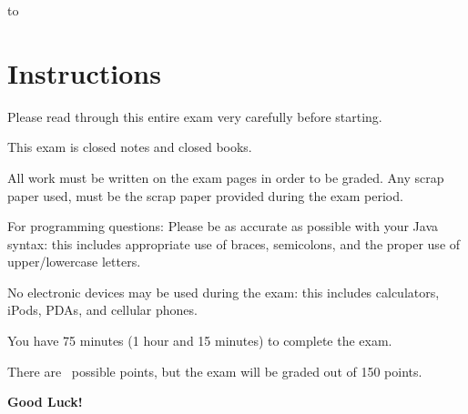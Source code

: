\documentclass[11pt]{exam}
\begin{document}
\vspace{3.0in}
\begin{center} 
\end{center} 

\lstset{language=Python,numbers=left}

\vspace{0.1in} 
\hbox to \textwidth{Name:\enspace\hrulefill} 

\section*{Instructions}
Please read through this entire exam very carefully before starting.
\par
This exam is closed notes and closed books.
\par
All work must be written on the exam pages in order to be graded.   Any scrap paper used, must be the scrap paper provided during the exam period.
\par
For programming questions: Please be as accurate as possible with your Java syntax: this includes appropriate use of braces, semicolons, and the proper use of upper/lowercase letters.  
\par
No electronic devices may be used during the exam: this includes calculators, iPods, PDAs, and cellular phones.
\par
You have 75 minutes (1 hour and 15 minutes) to complete the exam.  
\par
There are \numpoints\ possible points, but the exam will be graded out of 150 points.
\par
{\bf Good Luck!}


\pagebreak
\end{document}
